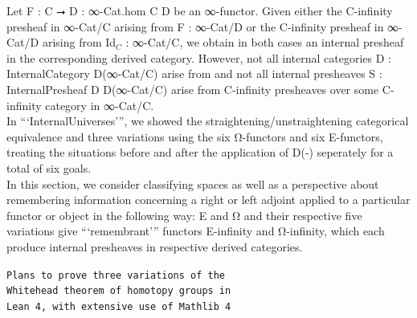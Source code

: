 \documentclass{book}
\theoremstyle{definition}
\begin{document}
Let F : C ⭢ D : ∞-Cat.hom C D be an ∞-functor. Given either the C-infinity presheaf in ∞-Cat/C arising from F : ∞-Cat/D or the C-infinity presheaf in ∞-Cat/D arising from Id${}_{C}$ : ∞-Cat/C, we obtain in both cases an internal presheaf in the corresponding derived category. However, not all internal categories D : InternalCategory D(∞-Cat/C) arise from and not all internal presheaves S : InternalPresheaf D D(∞-Cat/C) arise from C-infinity presheaves over some C-infinity category in ∞-Cat/C.\\

In ```InternalUniverses''', we showed the straightening/unstraightening categorical equivalence and three variations using the six Ω-functors and six E-functors, treating the situations before and after the application of D(-) seperately for a total of six goals.\\

In this section, we consider classifying spaces as well as a perspective about remembering information concerning a right or left adjoint applied to a particular functor or object in the following way: E and Ω and their respective five variations give  ```remembrant''' functors E-infinity and Ω-infinity, which each produce internal presheaves in respective derived categories.\\


\begin{center}
\texttt{Plans to prove three variations of the}\\
\texttt{Whitehead theorem of homotopy groups in}\\
\texttt{Lean 4, with extensive use of Mathlib 4}
\end{center}

\thispagestyle{empty}

\ \\
{\footnotesize
\begin{center}
\end{center}}
 
\end{document}
